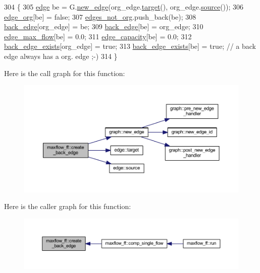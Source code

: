 \begin{DoxyCode}
304 \{
305     \mbox{\hyperlink{classedge}{edge}} be = G.\mbox{\hyperlink{classgraph_a02a0c3a219f75d68caa408ef339d4a1c}{new\_edge}}(org\_edge.\mbox{\hyperlink{classedge_a97563b611261478ee19c6ce055f1a3ee}{target}}(), org\_edge.\mbox{\hyperlink{classedge_ae82d5701f7e6f71edc3c8b0e34bcd2b7}{source}}());
306     \mbox{\hyperlink{classmaxflow__ff_aa9fd46b8da1a67678b132a17e7a41c91}{edge\_org}}[be] = \textcolor{keyword}{false};
307     \mbox{\hyperlink{classmaxflow__ff_a489798941deb8122a385684c7d416f92}{edges\_not\_org}}.push\_back(be);
308     \mbox{\hyperlink{classmaxflow__ff_abceef8f9ee5acf7a992301de6d0c80de}{back\_edge}}[org\_edge] = be;
309     \mbox{\hyperlink{classmaxflow__ff_abceef8f9ee5acf7a992301de6d0c80de}{back\_edge}}[be] = org\_edge;
310     \mbox{\hyperlink{classmaxflow__ff_a669f36f1fae2dd0f6cfc0172e3ae0e8f}{edge\_max\_flow}}[be] = 0.0;
311     \mbox{\hyperlink{classmaxflow__ff_a5b38943e093c77a57eb70f1a4190b8a6}{edge\_capacity}}[be] = 0.0;
312     \mbox{\hyperlink{classmaxflow__ff_a686006593b17dfd3ad9a5e02b1ad9e92}{back\_edge\_exists}}[org\_edge] = \textcolor{keyword}{true};
313     \mbox{\hyperlink{classmaxflow__ff_a686006593b17dfd3ad9a5e02b1ad9e92}{back\_edge\_exists}}[be] = \textcolor{keyword}{true};    \textcolor{comment}{// a back edge always has a org. edge ;-)}
314 \}
\end{DoxyCode}
Here is the call graph for this function\+:\nopagebreak
\begin{figure}[H]
\begin{center}
\leavevmode
\includegraphics[width=350pt]{classmaxflow__ff_aea04831f46fb86990c9ba21fb19d0382_cgraph}
\end{center}
\end{figure}
Here is the caller graph for this function\+:\nopagebreak
\begin{figure}[H]
\begin{center}
\leavevmode
\includegraphics[width=350pt]{classmaxflow__ff_aea04831f46fb86990c9ba21fb19d0382_icgraph}
\end{center}
\end{figure}
\mbox{\label{classmaxflow__ff_a410a7c5b9b75225ec0a48402dc2f6555}} 
